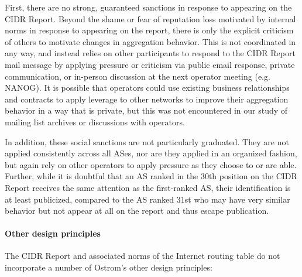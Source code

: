 First, there are no strong, guaranteed sanctions in response to appearing on
the CIDR Report. Beyond the shame or fear of reputation loss motivated by
internal norms in response to appearing on the report, there is only the
explicit criticism of others to motivate changes in aggregation behavior. This
is not coordinated in any way, and instead relies on other participants to
respond to the CIDR Report mail message by applying pressure or criticism via
public email response, private communication, or in-person discussion at the
next operator meeting (e.g. NANOG). It is possible that operators could use
existing business relationships and contracts to apply leverage to other
networks to improve their aggregation behavior in a way that is private, but
this was not encountered in our study of mailing list archives or discussions
with operators.

In addition, these social sanctions are not particularly graduated. They are
not applied consistently across all ASes, nor are they applied in an organized
fashion, but again rely on other operators to apply pressure as they choose to
or are able. Further, while it is doubtful that an AS ranked in the 30th
position on the CIDR Report receives the same attention as the first-ranked AS,
their identification is at least publicized, compared to the AS ranked 31st who
may have very similar behavior but not appear at all on the report and thus
escape publication.

%
%

\paragraph{Other design principles}

The CIDR Report and associated norms of the Internet routing table do not
incorporate a number of Ostrom's other design principles:

